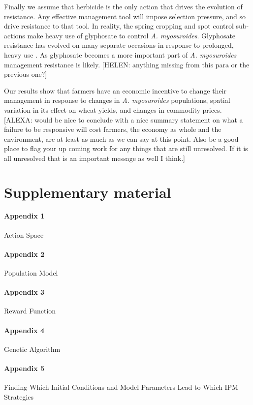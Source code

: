 \documentclass[12pt, a4paper]{article}
\begin{document}
Finally we assume that herbicide is the only action that drives the evolution of resistance. Any effective management tool will impose selection pressure, and so drive resistance to that tool. In reality, the spring cropping and spot control sub-actions make heavy use of glyphosate to control \textit{A. myosuroides}. Glyphosate resistance has evolved on many separate occasions in response to prolonged, heavy use \citep{Samm2014}. As glyphosate becomes a more important part of \textit{A. myosuroides} management \citep{Hick2018} resistance is likely. [HELEN: anything missing from this para or the previous one?]         

Our results show that farmers have an economic incentive to change their management in response to changes in \textit{A. myosuroides} populations, spatial variation in its effect on wheat yields, and changes in commodity prices. [ALEXA: would be nice to conclude with a nice summary statement on what a failure to be responsive will cost farmers, the economy as whole and the environment, are at least as much as we can say at this point. Also be a good place to flag your up coming work for any things that are still unresolved. If it is all unresolved that is an important message as well I think.] 

\section*{Supplementary material}
\paragraph*{Appendix 1}
\label{app:A_space}
Action Space
\paragraph*{Appendix 2}
\label{app:pop_model}
Population Model
\paragraph*{Appendix 3}
\label{app:Re_fun}
Reward Function
\paragraph*{Appendix 4}
\label{app:GA}
Genetic Algorithm
\paragraph*{Appendix 5}
\label{app:meta_mod}
Finding Which Initial Conditions and Model Parameters Lead to Which IPM Strategies


 
\end{document}
